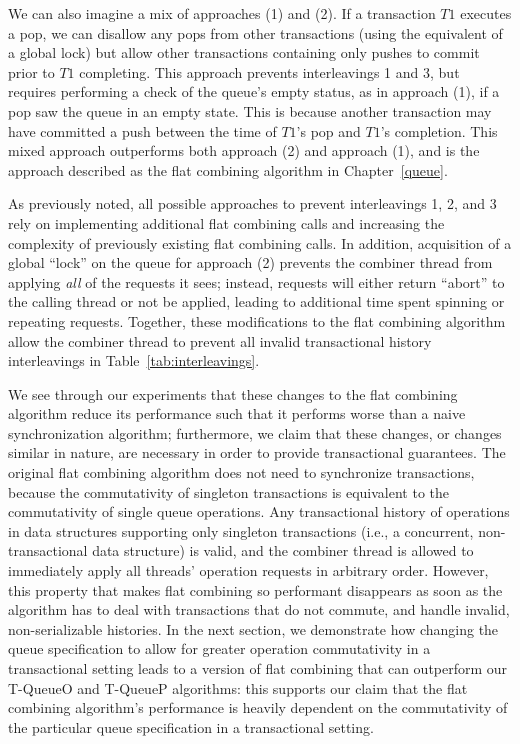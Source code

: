 We can also imagine a mix of approaches (1) and (2). If a transaction $T1$ executes a pop, we can disallow any pops from other transactions (using the equivalent of a global lock) but allow other transactions containing only pushes to commit prior to $T1$ completing. This approach prevents interleavings 1 and 3, but requires performing a check of the queue's empty status, as in approach (1), if a pop saw the queue in an empty state. This is because another transaction may have committed a push between the time of $T1$'s pop and $T1$'s completion. This mixed approach outperforms both approach (2) and approach (1), and is the approach described as the flat combining algorithm in Chapter~\ref{queue}. 

As previously noted, all possible approaches to prevent interleavings 1, 2, and 3 rely on implementing additional flat combining calls and increasing the complexity of previously existing flat combining calls. In addition, acquisition of a global ``lock'' on the queue for approach (2) prevents the combiner thread from applying \emph{all} of the requests it sees; instead, requests will either return ``abort'' to the calling thread or not be applied, leading to additional time spent spinning or repeating requests. Together, these modifications to the flat combining algorithm allow the combiner thread to prevent all invalid transactional history interleavings in Table~\ref{tab:interleavings}.

We see through our experiments that these changes to the flat combining algorithm reduce its performance such that it performs worse than a naive synchronization algorithm; furthermore, we claim that these changes, or changes similar in nature, are necessary in order to provide transactional guarantees. The original flat combining algorithm does not need to synchronize transactions, because the commutativity of singleton transactions is equivalent to the commutativity of single queue operations. Any transactional history of operations in data structures supporting only singleton transactions (i.e., a concurrent, non-transactional data structure) is valid, and the combiner thread is allowed to immediately apply all threads' operation requests in arbitrary order. However, this property that makes flat combining so performant disappears as soon as the algorithm has to deal with transactions that do not commute, and handle invalid, non-serializable histories. In the next section, we demonstrate how changing the queue specification to allow for greater operation commutativity in a transactional setting leads to a version of flat combining that can outperform our T-QueueO and T-QueueP algorithms: this supports our claim that the flat combining algorithm's performance is heavily dependent on the commutativity of the particular queue specification in a transactional setting.
